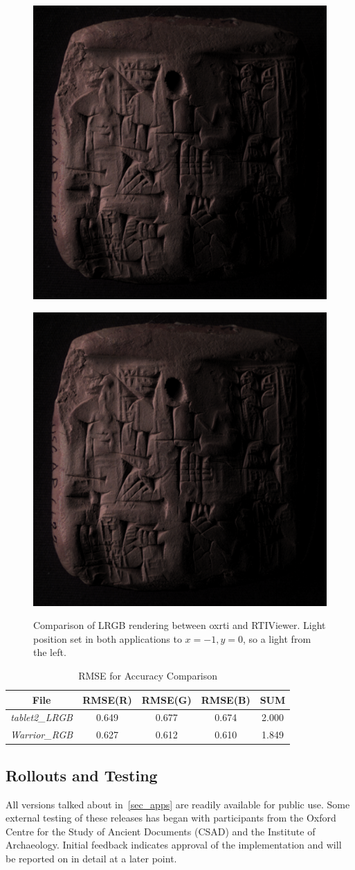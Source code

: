 \begin{figure}
\begin{subfloat}{\includegraphics[max width=0.5\linewidth]{images/tablet2_RTIViewer}}\end{subfloat}
\begin{subfloat}{\includegraphics[max width=0.5\linewidth]{images/tablet2_oxrti}}\end{subfloat}
\caption[Tablet Comparison]{Comparison of LRGB rendering between oxrti and RTIViewer. Light position
set in both applications to $x=-1, y=0$, so a light from the left.}
\label{compare2}
\end{figure}

\begin{table}[H]
  \centering
\begin{tabular}{|c |  c c c | c|}
 \hline
 File & RMSE(R) & RMSE(G) & RMSE(B) & SUM  \\
  \hline
  \emph{tablet2\_LRGB} & 0.649 & 0.677 & 0.674  & 2.000 \\
  \emph{Warrior\_RGB} &0.627 & 0.612 & 0.610 & 1.849  \\
 \hline
\end{tabular}
\caption[RMSE for Accuracy Comparison]{RMSE for Accuracy Comparison}
\label{table_Accuracy}
\end{table}

\subsection{Rollouts and Testing}
All versions talked about in~\autoref{sec_apps} are readily available for public
use. Some external testing of these releases has began with participants from the Oxford Centre
for the Study of Ancient Documents (CSAD) and the Institute of Archaeology.
Initial feedback indicates approval of the implementation and will be reported
on in detail at a later point.